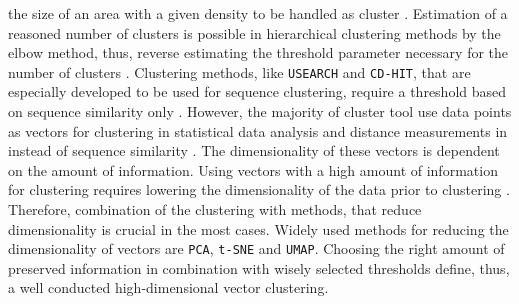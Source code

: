 the size of an area with a given density to be handled as cluster \autocite{madhulatha_overview_2012}. Estimation of a reasoned number of clusters is possible in hierarchical clustering methods by the elbow method, thus, reverse estimating the threshold parameter necessary for the number of clusters \autocite{satopaa_finding_2011, madhulatha_overview_2012}. Clustering methods, like \texttt{USEARCH} and \texttt{CD-HIT}, that are especially developed to be used for sequence clustering, require a threshold based on sequence similarity only \autocite{li_cd-hit_2006, edgar_usearch_2010}. However, the majority of cluster tool use data points as vectors for clustering in statistical data analysis and distance measurements in instead of sequence similarity \autocite{madhulatha_overview_2012}. The dimensionality of these vectors is dependent on the amount of information. Using vectors with a high amount of information for clustering requires lowering the dimensionality of the data prior to clustering \autocite{assent_clustering_2012}. Therefore, combination of the clustering with methods, that reduce dimensionality is crucial in the most cases. Widely used methods for reducing the dimensionality of vectors are \texttt{PCA}, \texttt{t-SNE} and \texttt{UMAP}. Choosing the right amount of preserved information in combination with wisely selected thresholds define, thus, a well conducted high-dimensional vector clustering. 


